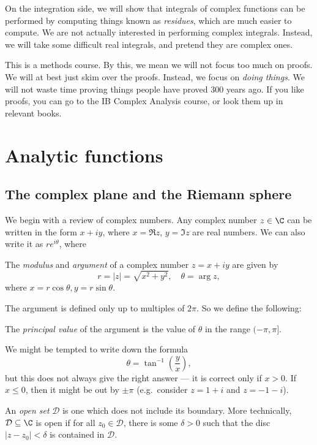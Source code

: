 \documentclass[a4paper]{article}
\begin{document}
On the integration side, we will show that integrals of complex functions can be performed by computing things known as \emph{residues}, which are much easier to compute. We are not actually interested in performing complex integrals. Instead, we will take some difficult real integrals, and pretend they are complex ones.

This is a methods course. By this, we mean we will not focus too much on proofs. We will at best just skim over the proofs. Instead, we focus on \emph{doing things}. We will not waste time proving things people have proved 300 years ago. If you like proofs, you can go to the IB Complex Analysis course, or look them up in relevant books.

\section{Analytic functions}
\subsection{The complex plane and the Riemann sphere}
We begin with a review of complex numbers. Any complex number $z \in \C$ can be written in the form $x + iy$, where $x = \Re z$, $y = \Im z$ are real numbers. We can also write it as $r e^{i\theta}$, where
\begin{defi}
  The \emph{modulus} and \emph{argument} of a complex number $z = x + iy$ are given by
  \[
    r = |z| = \sqrt{x^2 + y^2}, \quad \theta = \arg z,
  \]
  where $x = r \cos \theta, y = r \sin \theta$.
\end{defi}
The argument is defined only up to multiples of $2\pi$. So we define the following:
\begin{defi}
  The \emph{principal value} of the argument is the value of $\theta$ in the range $(-\pi, \pi]$.
\end{defi}
We might be tempted to write down the formula
\[
  \theta = \tan^{-1} \left(\frac{y}{x}\right),
\]
but this does not always give the right answer --- it is correct only if $x > 0$. If $x \leq 0$, then it might be out by $\pm \pi$ (e.g.\ consider $z = 1 + i$ and $z = -1 - i$).

\begin{defi}
  An \emph{open set} $\mathcal{D}$ is one which does not include its boundary. More technically, $\mathcal{D} \subseteq \C$ is open if for all $z_0 \in \mathcal{D}$, there is some $\delta > 0$ such that the disc $|z - z_0| < \delta$ is contained in $\mathcal{D}$.
\end{defi}
\end{document}

